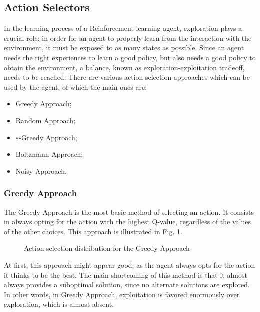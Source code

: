 \documentclass[a4paper, 12pt]{article}
\numberwithin{equation}{section}
\begin{document}
\subsection{Action Selectors}
In the learning process of a Reinforcement learning agent, exploration \cite{action-selectors} plays a crucial role: in order for an agent to properly learn from the interaction with the environment, it must be exposed to as many states as possible. Since an agent needs the right experiences to learn a good policy, but also needs a good policy to obtain the environment, a balance, known as exploration-exploitation tradeoff, needs to be reached. There are various action selection approaches which can be used by the agent, of which the main ones are:
\begin{itemize}
	\item Greedy Approach;
	\item Random Approach;
	\item $\varepsilon$-Greedy Approach;
	\item Boltzmann Approach;
	\item Noisy Approach.
\end{itemize}


\subsubsection{Greedy Approach}

The Greedy Approach is the most basic method of selecting an action. It consists in always opting for the action with the highest Q-value, regardless of the values of the other choices. This approach is illustrated in Fig. \ref{fig:greedy}.

\begin{figure}[h]
	\centering
		\caption{Action selection distribution for the Greedy Approach}
	\label{fig:greedy}
\end{figure}

At first, this approach might appear good, as the agent always opts for the action it thinks to be the best. The main shortcoming of this method is that it almost always provides a suboptimal solution, since no alternate solutions are explored. In other words, in Greedy Approach, exploitation is favored enormously over exploration, which is almost absent. 
\end{document}
